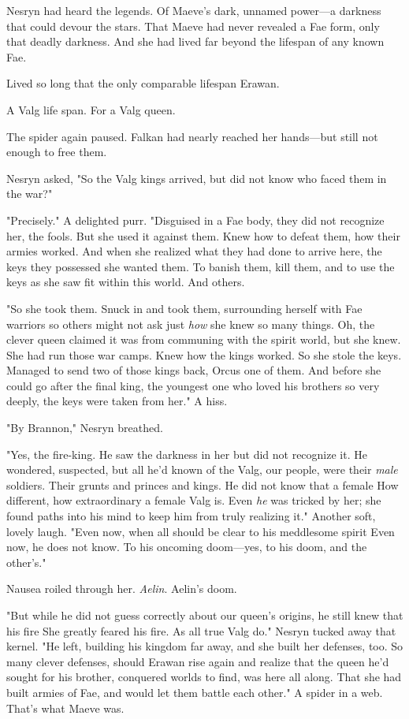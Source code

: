 Nesryn had heard the legends. Of Maeve's dark, unnamed power---a darkness that could devour the stars. That Maeve had never revealed a Fae form, only that deadly darkness. And she had lived far beyond the lifespan of any known Fae.

Lived so long that the only comparable lifespan  Erawan.

A Valg life span. For a Valg queen.

The spider again paused. Falkan had nearly reached her hands---but still not enough to free them.

Nesryn asked, "So the Valg kings arrived, but did not know who faced them in the war?"

"Precisely." A delighted purr. "Disguised in a Fae body, they did not recognize her, the fools. But she used it against them. Knew how to defeat them, how their armies worked. And when she realized what they had done to arrive here, the keys they possessed  she wanted them. To banish them, kill them, and to use the keys as she saw fit within this world. And others.

"So she took them. Snuck in and took them, surrounding herself with Fae warriors so others might not ask just \emph{how} she knew so many things. Oh, the clever queen claimed it was from communing with the spirit world, but  she knew. She had run those war camps. Knew how the kings worked. So she stole the keys. Managed to send two of those kings back, Orcus one of them. And before she could go after the final king, the youngest one who loved his brothers so very deeply, the keys were taken from her." A hiss.

"By Brannon," Nesryn breathed.

"Yes, the fire-king. He saw the darkness in her but did not recognize it. He wondered, suspected, but all he'd known of the Valg, our people, were their \emph{male} soldiers. Their grunts and princes and kings. He did not know that a female  How different, how extraordinary a female Valg is. Even \emph{he} was tricked by her; she found paths into his mind to keep him from truly realizing it." Another soft, lovely laugh. "Even now, when all should be clear to his meddlesome spirit
 Even now, he does not know. To his oncoming doom---yes, to his doom, and the other's."

Nausea roiled through her. \emph{Aelin}. Aelin's doom.

"But while he did not guess correctly about our queen's origins, he still knew that his fire  She greatly feared his fire. As all true Valg do." Nesryn tucked away that kernel. "He left, building his kingdom far away, and she built her defenses, too. So many clever defenses, should Erawan rise again and realize that the queen he'd sought for his brother, conquered worlds to find, was here all along. That she had built armies of Fae, and would let them battle each other." A spider in a web. That's what Maeve was.

